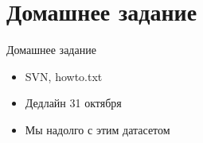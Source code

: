 \documentclass[14pt, fleqn, xcolor={dvipsnames, table}]{beamer}
\begin{document}
\section{Домашнее задание}

\begin{frame}{Домашнее задание}
\begin{itemize}
\item SVN, howto.txt
\item Дедлайн 31 октября
\item Мы надолго с этим датасетом
\end{itemize}
\end{frame}
\end{document}
